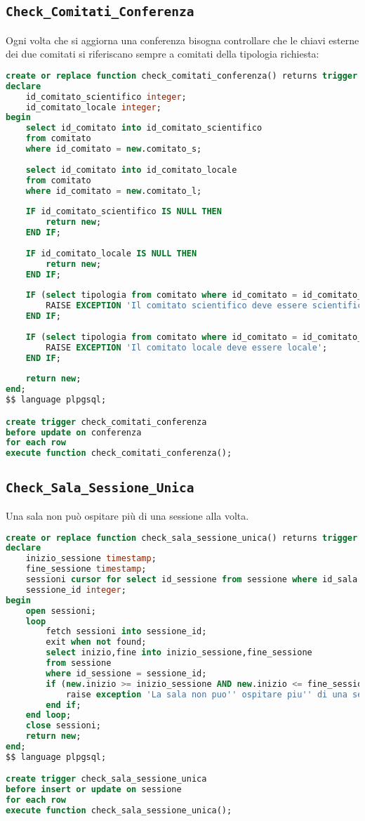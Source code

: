 \subsection{\texttt{Check\_Comitati\_Conferenza}}
Ogni volta che si aggiorna una conferenza bisogna controllare che le chiavi esterne dei due comitati si riferiscano sempre a comitati della tipologia richiesta:
\begin{lstlisting}[language=SQL, caption={\texttt{check\_comitati\_conferenza}},style=mystyle]
create or replace function check_comitati_conferenza() returns trigger as $$
declare 
    id_comitato_scientifico integer;
    id_comitato_locale integer;
begin
    select id_comitato into id_comitato_scientifico
    from comitato
    where id_comitato = new.comitato_s;
    
    select id_comitato into id_comitato_locale
    from comitato
    where id_comitato = new.comitato_l;
    
    IF id_comitato_scientifico IS NULL THEN
        return new;
    END IF;
    
    IF id_comitato_locale IS NULL THEN
        return new;
    END IF;
    
    IF (select tipologia from comitato where id_comitato = id_comitato_scientifico) <> 'scientifico' THEN
        RAISE EXCEPTION 'Il comitato scientifico deve essere scientifico';
    END IF;
    
    IF (select tipologia from comitato where id_comitato = id_comitato_locale) <> 'locale' THEN
        RAISE EXCEPTION 'Il comitato locale deve essere locale';
    END IF;
    
    return new;
end;
$$ language plpgsql;

create trigger check_comitati_conferenza
before update on conferenza
for each row
execute function check_comitati_conferenza();
\end{lstlisting}
\subsection{\texttt{Check\_Sala\_Sessione\_Unica}}
Una sala non può ospitare più di una sessione alla volta.
\begin{lstlisting}[caption={\texttt{Check\_sala\_sessione\_unica}}, language=SQL, style=mystyle]
create or replace function check_sala_sessione_unica() returns trigger as $$
declare
    inizio_sessione timestamp;
    fine_sessione timestamp;
    sessioni cursor for select id_sessione from sessione where id_sala = new.id_sala;
    sessione_id integer;
begin
    open sessioni;
    loop
        fetch sessioni into sessione_id;
        exit when not found;
        select inizio,fine into inizio_sessione,fine_sessione
        from sessione
        where id_sessione = sessione_id;
        if (new.inizio >= inizio_sessione AND new.inizio <= fine_sessione) OR (new.fine >= inizio_sessione AND new.fine <= fine_sessione) then
            raise exception 'La sala non puo'' ospitare piu'' di una sessione alla volta';
        end if;
    end loop;
    close sessioni;
    return new;
end;
$$ language plpgsql;

create trigger check_sala_sessione_unica
before insert or update on sessione
for each row
execute function check_sala_sessione_unica();
\end{lstlisting}
